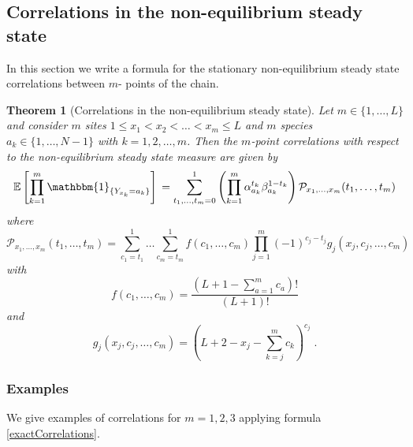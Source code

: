 \documentclass[10pt]{article}
\numberwithin{equation}{section}
\numberwithin{equation}{subsection}
\newtheorem{theorem}{Theorem}
\newcommand{\dt}{\;.}
\begin{document}
\subsection{Correlations in the non-equilibrium steady state}\label{subsection-exact}
In this section we write a formula for the stationary non-equilibrium steady state correlations between $m$- points of the chain.
\begin{theorem}[Correlations in the non-equilibrium steady state]\label{thm-correlations}
Let $m\in \{1,\ldots,L\}$ and consider $m$ sites $1 \le x_{1} < x_2 < \ldots < x_m \le L $ and
$m$ species $a_{k}\in\{1,\ldots,N-1\}$  with $k=1,2,\ldots, m$.
Then the $m$-point correlations with respect to the non-equilibrium steady state measure are given by 
\begin{equation}\label{exactCorrelations}
\mathbb{E}\left[\prod_{k=1}^{m}\mathbbm{1}_{\{Y_{x_{k}}=a_{k}\}}\right]\\=\sum_{t_{1},\ldots,t_{m}=0}^{1}\left(\prod_{k=1}^{m}\alpha_{a_{k}}^{t_{k}}\beta_{a_{k}}^{1-t_{k}}\right)\mathcal{P}_{x_{1},\ldots,x_{m}}(t_{1},\ldots,t_{m})
\end{equation}
where
\begin{equation}\label{abs-probabilities}
	\mathcal{P}_{x_{1},\ldots,x_{m}}(t_{1},\ldots,t_{m})=\sum_{c_{1}=t_{1}}^{1}\ldots\sum_{c_{m}=t_{m}}^{1}f(c_{1},\ldots,c_{m})\prod_{j=1}^{m}(-1)^{c_{j}-t_{j}}g_{j}(x_{j},c_{j},\ldots,c_{m})
\end{equation}
with
\begin{equation}\label{powerCoeffNOspec}
	f(c_{1},\ldots,c_{m})=\frac{(L+1-\sum_{a=1}^{m}c_{a})!}{(L+1)!}
\end{equation}
and
\begin{equation}\label{powerCoeffSpecies}
	g_{j}(x_{j},c_{j},\ldots,c_{m})=\left(L+2-x_{j}-\sum_{k=j}^{m}c_{k}\right)^{c_{j}}\dt
\end{equation}
\end{theorem}

\subsubsection{Examples}
We give examples  of correlations for $m=1,2,3$ applying formula \eqref{exactCorrelations}.
\end{document}
